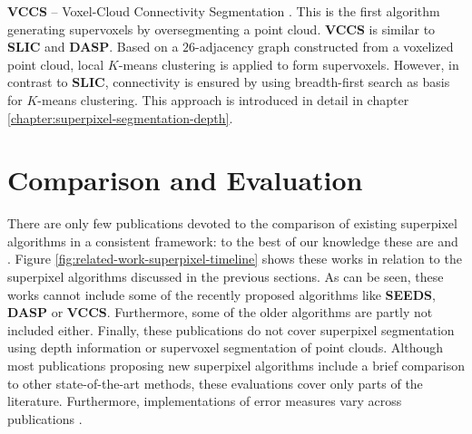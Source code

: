 \textbf{VCCS} -- Voxel-Cloud Connectivity Segmentation \cite{PaponAbramovSchoelerWoergoetter:2013}. This is the first algorithm generating supervoxels by oversegmenting a point cloud. \textbf{VCCS} is similar to \textbf{SLIC} and \textbf{DASP}. Based on a $26$-adjacency graph constructed from a voxelized point cloud, local $K$-means clustering is applied to form supervoxels. However, in contrast to \textbf{SLIC}, connectivity is ensured by using breadth-first search as basis for $K$-means clustering. This approach is introduced in detail in chapter \ref{chapter:superpixel-segmentation-depth}.

%

\section{Comparison and Evaluation}
\label{section:related-work-comparison}

There are only few publications devoted to the comparison of existing superpixel algorithms in a consistent framework: to the best of our knowledge these are \cite{SchickFischerStiefelhagen:2012, AchantaShajiSmithLucchiFuaSuesstrunk:2012} and \cite{NeubertProtzel:2012}. Figure \ref{fig:related-work-superpixel-timeline} shows these works in relation to the superpixel algorithms discussed in the previous sections. As can be seen, these works cannot include some of the recently proposed algorithms like \textbf{SEEDS}, \textbf{DASP} or \textbf{VCCS}. Furthermore, some of the older algorithms are partly not included either. Finally, these publications do not cover superpixel segmentation using depth information or supervoxel segmentation of point clouds. Although most publications proposing new superpixel algorithms include a brief comparison to other state-of-the-art methods, these evaluations cover only parts of the literature. Furthermore, implementations of error measures vary across publications \cite{NeubertProtzel:2012}.

